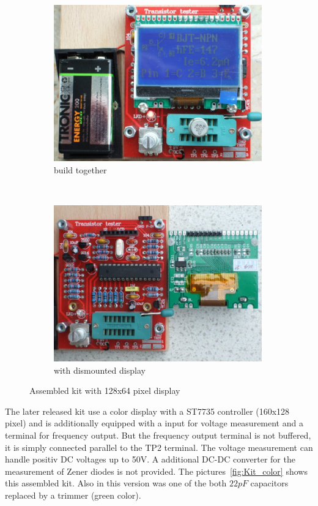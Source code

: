 \begin{figure}[H]
  \begin{subfigure}[b]{9cm}
    \centering
    \includegraphics[width=9cm]{../PNG/Kit_ST7565a.jpg}
    \caption{build together}
  \end{subfigure}
  ~
  \begin{subfigure}[b]{9cm}
    \centering
    \includegraphics[width=9cm]{../PNG/Kit_ST7565b.jpg}
    \caption{with dismounted display}
  \end{subfigure}
  \caption{Assembled kit with 128x64 pixel display}
  \label{fig:Kit_mono}
\end{figure}

The later released kit use a color display with a ST7735 controller (160x128 pixel)
and is additionally equipped with a input for voltage measurement and a terminal for frequency output.
But the frequency output terminal is not buffered, it is simply connected parallel to the TP2 terminal.
The voltage measurement can handle positiv DC voltages up to 50V. A additional DC-DC converter
for the measurement of Zener diodes is not provided. 
The pictures~\ref{fig:Kit_color} shows this assembled kit.
Also in this version was one of the both \(22 pF\) capacitors replaced
by a trimmer (green color).

